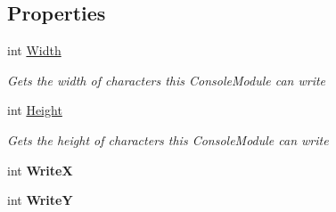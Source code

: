 \subsection*{Properties}
\begin{DoxyCompactItemize}
\item 
\hypertarget{class_m_b_c_1_1_app_1_1_terminal_1_1_terminal_module_aafdb96da8e28428f7fa6e2748b634bde}{int \hyperlink{class_m_b_c_1_1_app_1_1_terminal_1_1_terminal_module_aafdb96da8e28428f7fa6e2748b634bde}{Width}}\label{class_m_b_c_1_1_app_1_1_terminal_1_1_terminal_module_aafdb96da8e28428f7fa6e2748b634bde}

\begin{DoxyCompactList}\small\item\em Gets the width of characters this Console\-Module can write\end{DoxyCompactList}\item 
\hypertarget{class_m_b_c_1_1_app_1_1_terminal_1_1_terminal_module_ab8f92d9028ad8f9da6152fdeca575f72}{int \hyperlink{class_m_b_c_1_1_app_1_1_terminal_1_1_terminal_module_ab8f92d9028ad8f9da6152fdeca575f72}{Height}}\label{class_m_b_c_1_1_app_1_1_terminal_1_1_terminal_module_ab8f92d9028ad8f9da6152fdeca575f72}

\begin{DoxyCompactList}\small\item\em Gets the height of characters this Console\-Module can write\end{DoxyCompactList}\item 
\hypertarget{class_m_b_c_1_1_app_1_1_terminal_1_1_terminal_module_aeeb64c929c4a318b7e1ab8311bb984b6}{int {\bfseries Write\-X}}\label{class_m_b_c_1_1_app_1_1_terminal_1_1_terminal_module_aeeb64c929c4a318b7e1ab8311bb984b6}

\item 
\hypertarget{class_m_b_c_1_1_app_1_1_terminal_1_1_terminal_module_af3e76bf26865ca890180bb4cc7c16682}{int {\bfseries Write\-Y}}\label{class_m_b_c_1_1_app_1_1_terminal_1_1_terminal_module_af3e76bf26865ca890180bb4cc7c16682}

\end{DoxyCompactItemize}
